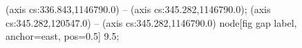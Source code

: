  (axis cs:336.843,1146790.0) -- (axis cs:345.282,1146790.0);
 (axis cs:345.282,120547.0) -- (axis cs:345.282,1146790.0)
  node[fig gap label, anchor=east, pos=0.5] {\texttimes{}9.5};

